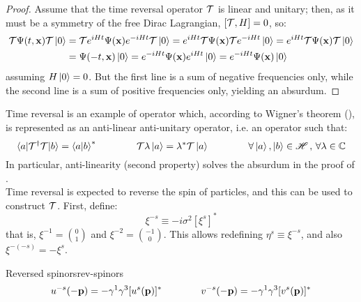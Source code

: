 \begin{proofbox}
  \begin{proof}
    Assume that the time reversal operator $ \mathcal{T} $ is linear and unitary; then, as it must be a symmetry of the free Dirac Lagrangian, $ [\mathcal{T} , H] = 0 $, so:
    \begin{equation*}
      \begin{split}
        \mathcal{T} \Psi(t,\mathbf{x}) \mathcal{T} \ket{0}
        &= \mathcal{T} e^{i H t} \Psi(\mathbf{x}) e^{-i H t} \mathcal{T} \ket{0} = e^{i H t} \mathcal{T} \Psi(\mathbf{x}) \mathcal{T} e^{-i H t} \ket{0} = e^{i H t} \mathcal{T} \Psi(\mathbf{x}) \mathcal{T} \ket{0} \\
        &= \Psi(-t,\mathbf{x}) \ket{0} = e^{-i H t} \Psi(\mathbf{x}) e^{i H t} \ket{0} = e^{-i H t} \Psi(\mathbf{x}) \ket{0}
      \end{split}
    \end{equation*}
    assuming $ H \ket{0} = 0 $. But the first line is a sum of negative frequencies only, while the second line is a sum of positive frequencies only, yielding an absurdum.
  \end{proof}
\end{proofbox}

Time reversal is an example of operator which, according to Wigner's theorem (), is represented as an anti-linear anti-unitary operator, i.e. an operator such that:
\begin{equation*}
  \braket{a | \mathcal{T}^\dagger \mathcal{T} | b} = \braket{a | b}^*
  \qquad \qquad
  \mathcal{T} \lambda \ket{a} = \lambda^* \mathcal{T} \ket{a}
  \qquad \qquad
  \forall \ket{a},\ket{b} \in \mathscr{H}\,,\,\forall \lambda \in \mathbb{C}
\end{equation*}
In particular, anti-linearity (second property) solves the absurdum in the proof of .\\
Time reversal is expected to reverse the spin of particles, and this can be used to construct $ \mathcal{T} $. First, define:
\begin{equation}
  \xi^{-s} \equiv -i \sigma^2 [\xi^s]^*
\end{equation}
that is, $ \xi^{-1} = \binom{0}{1} $ and $ \xi^{-2} = \binom{-1}{0} $. This allows redefining $ \eta^s \equiv \xi^{-s} $, and also $ \xi^{-(-s)} = - \xi^s $.

\begin{lemma}[before upper = {\tcbtitle}]{Reversed spinors}{rev-spinors}
  \begin{equation}
    u^{-s}(-\mathbf{p}) = - \gamma^1 \gamma^3 [u^s(\mathbf{p})]^*
    \qquad \qquad
    v^{-s}(-\mathbf{p}) = - \gamma^1 \gamma^3 [v^s(\mathbf{p})]^*
  \end{equation}
\end{lemma}

